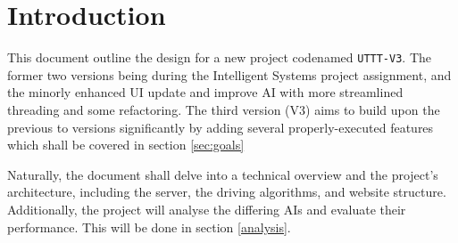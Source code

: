 \section{Introduction}

This document outline the design for a new project codenamed \verb|UTTT-V3|.
The former two versions being during the Intelligent Systems project assignment, and the 
minorly enhanced UI update and improve AI with more streamlined threading and some refactoring. 
The third version (V3) aims to build upon the previous to versions significantly by adding 
several properly-executed features which shall be covered in section \ref{sec:goals} 


Naturally, the document shall delve into a technical overview and the project's architecture, 
including the server, the driving algorithms, and website structure. 
Additionally, the project will analyse the differing AIs and evaluate their performance. 
This will be done in section \ref{analysis}.